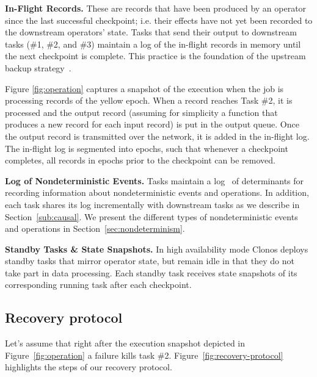 \documentclass[sigconf]{acmart}
\newcommand{\para}[1]{\vspace{1mm}\noindent\textbf{#1.}}
\begin{document}
\para{In-Flight Records}
These are records that have been produced by an operator since the last successful checkpoint;
i.e. their effects have not yet been recorded to the downstream operators' state.
Tasks that send their output to downstream tasks (\#1, \#2, and \#3) maintain a log of the in-flight records in memory until the next checkpoint is
complete.
This practice is the foundation of the upstream backup strategy~\cite{Hwang2005HAA}.

Figure \ref{fig:operation} captures a snapshot of the execution when the job is processing records of the yellow epoch. 
When a record reaches Task \#2, it is processed and the output record (assuming for simplicity a function that produces a new record for each input record) is put in the output queue. Once the output record is transmitted over the network, it is added in the in-flight log.
The in-flight log is segmented into epochs, such that whenever a checkpoint completes, all records in epochs prior to the checkpoint can be removed. %

\para{Log of Nondeterministic Events}
Tasks maintain a log~\cite{elnozahy1992manetho} of determinants for recording information about nondeterministic events and operations.
In addition, each task shares its log incrementally with downstream tasks as we describe in Section~\ref{sub:causal}.
We present the different types of nondeterministic events and operations in Section~\ref{sec:nondeterminism}.

\para{Standby Tasks \& State Snapshots}
In high availability mode Clonos deploys standby tasks that mirror operator state, but remain idle in that they do not take part in data processing.
Each standby task receives state snapshots of its corresponding running task after each checkpoint.

\subsection{Recovery protocol}
\label{sub:protocol-actions-recovery}

Let's assume that right after the execution snapshot depicted in Figure~\ref{fig:operation} a failure kills task \#2.
Figure~\ref{fig:recovery-protocol} highlights the steps of our recovery protocol.%
\end{document}
